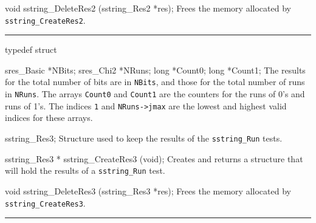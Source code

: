 void sstring_DeleteRes2 (sstring_Res2 *res);
\endcode
 \tab 
  Frees the memory allocated by {\tt sstring\_CreateRes2}.
 \endtab


\bigskip\hrule
\code


typedef struct {

   sres_Basic *NBits;
   sres_Chi2 *NRuns;
   long *Count0;
   long *Count1;
\endcode
 \tabb
  The results for the total number of bits are in {\tt NBits},
  and those for the total number of runs in {\tt NRuns}.
  The arrays {\tt Count0} and  {\tt Count1} are the counters for the
  runs of 0's and runs of 1's.
  The indices {\tt 1} and {\tt NRuns->jmax} are the lowest
  and highest valid indices for these arrays.
 \endtabb
\code

} sstring_Res3;
\endcode
 \tab
  Structure used to keep the results of the {\tt sstring\_Run} tests.
 \endtab
\code


sstring_Res3 * sstring_CreateRes3 (void);
\endcode
 \tab 
  Creates and returns a structure that will hold the results
  of a  {\tt sstring\_Run} test. 
 \endtab
\code


void sstring_DeleteRes3 (sstring_Res3 *res);
\endcode
 \tab 
  Frees the memory allocated by {\tt sstring\_CreateRes3}.
 \endtab


\bigskip\hrule
\code


